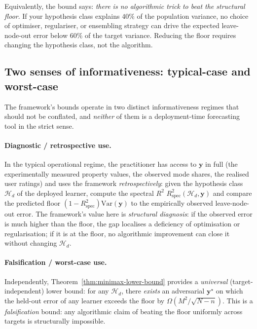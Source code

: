 \documentclass[11pt,a4paper]{article}
\theoremstyle{plain}
\theoremstyle{definition}
\theoremstyle{remark}
\newcommand{\by}{\mathbf{y}}
\newcommand{\Var}{\mathrm{Var}}
\newcommand{\Rspec}{R^2_{\mathrm{spec}}}
\newcommand{\Hcal}{\mathcal{H}}
\begin{document}
Equivalently, the bound says: \emph{there is no algorithmic trick to
beat the structural floor}.  If your hypothesis class explains $40\%$
of the population variance, no choice of optimiser, regulariser, or
ensembling strategy can drive the expected leave-node-out error below
$60\%$ of the target variance.  Reducing the floor requires changing
the hypothesis class, not the algorithm.

\subsection{Two senses of informativeness: typical-case and worst-case}
\label{subsec:two-senses}

The framework's bounds operate in two distinct informativeness
regimes that should not be conflated, and \emph{neither} of them
is a deployment-time forecasting tool in the strict sense.

\paragraph{Diagnostic / retrospective use.}  In the typical
operational regime, the practitioner has access to $\by$
in full (the experimentally measured property values, the
observed mode shares, the realised user ratings) and uses the
framework \emph{retrospectively}: given the hypothesis class
$\Hcal_d$ of the deployed learner, compute the spectral $R^2$
$\Rspec(\Hcal_d, \by)$ and compare the predicted floor
$(1 - \Rspec)\Var(\by)$ to the empirically observed
leave-node-out error.  The framework's value here is
\emph{structural diagnosis}: if the observed error is much higher
than the floor, the gap localises a deficiency of optimisation
or regularisation; if it is at the floor, no algorithmic
improvement can close it without changing $\Hcal_d$.

\paragraph{Falsification / worst-case use.}  Independently,
Theorem~\ref{thm:minimax-lower-bound} provides a
\emph{universal} (target-independent) lower bound: for any
$\Hcal_d$, there \emph{exists} an adversarial $\by^\star$ on
which the held-out error of any learner exceeds the floor by
$\Omega(M^2/\sqrt{N-n})$.  This is a \emph{falsification} bound:
any algorithmic claim of beating the floor uniformly across
targets is structurally impossible.
\end{document}

